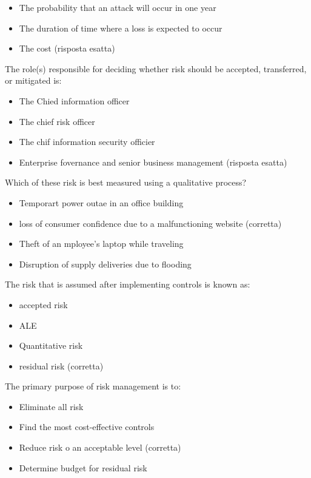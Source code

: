 
\begin{itemize}
\item The probability that an attack will occur in one year
\item The duration of time where a loss is expected to occur
\item The cost (risposta esatta)
\end{itemize}


The role(s) responsible for deciding whether risk should be accepted,
transferred, or mitigated is:
\begin{itemize}
\item The Chied information officer
\item The chief risk officer
\item The chif information security officier
\item Enterprise fovernance and senior business management (risposta esatta)
\end{itemize}


Which of these risk is best measured using a qualitative process?
\begin{itemize}
\item Temporart power outae in an office building
\item loss of consumer confidence due to a malfunctioning website (corretta)
\item Theft of an mployee's laptop while traveling
\item Disruption of supply deliveries due to flooding
\end{itemize}

The risk that is assumed after implementing controls is known as:

\begin{itemize}
\item accepted risk
\item ALE
\item Quantitative risk
\item residual risk (corretta)
\end{itemize}

The primary purpose of risk management is to:
\begin{itemize}
\item Eliminate all risk
\item Find the most cost-effective controls
\item Reduce risk o an acceptable level (corretta)
\item Determine budget for residual risk
\end{itemize}

